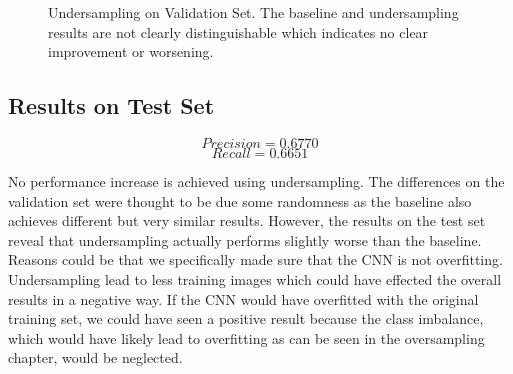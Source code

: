 \begin{figure}[!ht]
    \centering
    \par\medskip
    \centering
    \par\medskip
  \caption{Undersampling on Validation Set. The baseline and undersampling results are not clearly distinguishable which indicates no clear improvement or worsening.}
  \label{fig:under_val}
\end{figure}

\subsection{Results on Test Set}

\begin{equation}
Precision = 0.6770
\end{equation}
\begin{equation}
Recall = 0.6651
\end{equation}

No performance increase is achieved using undersampling. The differences on the validation set were thought to be due some randomness as the baseline also achieves different but very similar results. However, the results on the test set reveal that undersampling actually performs slightly worse than the baseline. \\
Reasons could be that we specifically made sure that the CNN is not overfitting. Undersampling lead to less training images which could have effected the overall results in a negative way. If the CNN would have overfitted with the original training set, we could have seen a positive result because the class imbalance, which would have likely lead to overfitting as can be seen in the oversampling chapter, would be neglected.   